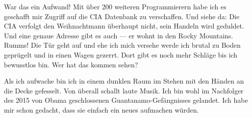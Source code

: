 War das ein Aufwand! Mit über 200 weiteren Programmierern habe ich es geschafft mir Zugriff auf die CIA Datenbank zu verschaffen. Und siehe da: Die CIA verfolgt den Weihnachtmann überhaupt nicht, sein Handeln wird geduldet. Und eine genaue Adresse gibt es auch — er wohnt in den Rocky Mountains. Rumms! Die Tür geht auf und ehe ich mich versehe werde ich brutal zu Boden geprügelt und in einen Wagen gezerrt. Dort gibt es noch mehr Schläge bis ich bewusstlos bin. Wer hat das kommen sehen?

Als ich aufwache bin ich in einem dunklen Raum im Stehen mit den Händen an die Decke gefesselt. Von überall schallt laute Musik. Ich bin wohl im Nachfolger des 2015 von Obama geschlossenen Guantanamo-Gefängnisses gelandet. Ich habe mir schon gedacht, dass sie einfach ein neues aufmachen würden.